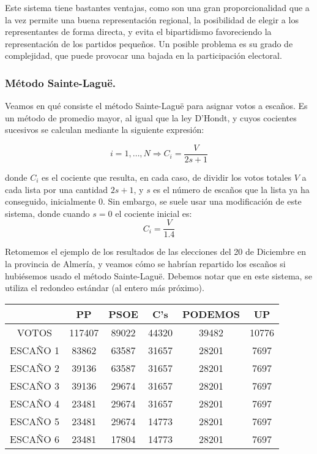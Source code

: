 \documentclass[11pt]{article}
\newcommand\console[1]{{\inconsolata #1}}
\begin{document}
Este sistema tiene bastantes ventajas, como son una gran proporcionalidad que a la vez permite una buena representación regional, la posibilidad de elegir a los representantes de forma directa, y evita el bipartidismo favoreciendo la representación de los partidos pequeños. Un posible problema es su grado de complejidad, que puede provocar una bajada en la participación electoral.

\subsubsection{Método Sainte-Laguë.}

Veamos en qué consiste el método Sainte-Laguë para asignar votos a escaños. Es un método de promedio mayor, al igual que la ley D'Hondt, y cuyos cocientes sucesivos se calculan mediante la siguiente expresión:

$$ i = 1,\ldots,N \Rightarrow C_i = \dfrac{V}{2s + 1}$$
	
	donde $C_i$ es el cociente que resulta, en cada caso, de dividir los votos totales $V$ a cada lista por una cantidad $2s + 1$, y $s$ es el número de escaños que la lista ya ha conseguido, inicialmente 0. Sin embargo, se suele usar una modificación de este sistema, donde cuando $s=0$ el cociente inicial es: $$ C_i = \frac{V}{1.4} $$

Retomemos el ejemplo de los resultados de las elecciones del 20 de Diciembre en la provincia de Almería, y veamos cómo se habrían repartido los escaños si hubiésemos usado el método Sainte-Laguë. Debemos notar que en este sistema, se utiliza el redondeo estándar (al entero más próximo).\\
\console{
\begin{center}
\begin{tabular}{|c|c|c|c|c|c|}
	\hline
	 & PP & PSOE & C's & PODEMOS & UP \\
	\hline
	VOTOS & 117407 & 89022 & 44320 & 39482 & 10776 \\
	\hline
	ESCAÑO 1 &\cellcolor{gray!25} 83862 & 63587 & 31657 & 28201 & 7697 \\
	\hline
	ESCAÑO 2 & 39136 &\cellcolor{gray!25} 63587 & 31657 & 28201 & 7697 \\
	\hline
	ESCAÑO 3 &\cellcolor{gray!25} 39136 & 29674 & 31657 & 28201 & 7697 \\
	\hline
	ESCAÑO 4 & 23481 & 29674 &\cellcolor{gray!25} 31657 & 28201 & 7697 \\
	\hline
	ESCAÑO 5 & 23481 &\cellcolor{gray!25} 29674 & 14773 & 28201 & 7697 \\
	\hline
	ESCAÑO 6 & 23481 & 17804 & 14773 &\cellcolor{gray!25} 28201 & 7697 \\
	\hline 
\end{tabular}
\end{center}
}
\end{document}
